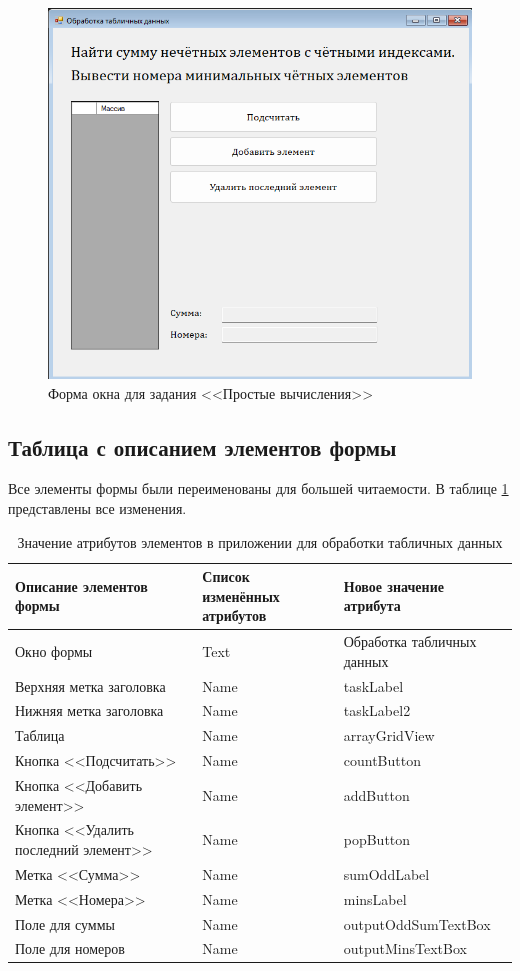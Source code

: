 \begin{figure}
\centering
\includegraphics[width=0.5\linewidth]{images/handling-data-easy/form.png}
\caption{Форма окна для задания <<Простые вычисления>>}
\label{handling-data-easy-form}
\end{figure}

\subsection{Таблица с описанием элементов формы}
Все элементы формы были переименованы для большей читаемости. В таблице \ref{tab:handling-data-easy-form} представлены все изменения.

\begin{table}
\centering
\begin{tabular}{|m{}|m{}|m{}|}
\hline
\textbf{Описание элементов формы} & \textbf{Список изменённых атрибутов} & \textbf{Новое значение атрибута} \\
\hline
\hline
Окно формы & Text & Обработка табличных данных \\
Верхняя метка заголовка & Name & taskLabel \\
Нижняя метка заголовка & Name & taskLabel2 \\
Таблица & Name & arrayGridView \\
Кнопка <<Подсчитать>> & Name & countButton \\
Кнопка <<Добавить элемент>> & Name & addButton \\
Кнопка <<Удалить последний элемент>> & Name & popButton \\
Метка <<Сумма>> & Name & sumOddLabel \\
Метка <<Номера>> & Name & minsLabel \\
Поле для суммы & Name & outputOddSumTextBox \\
Поле для номеров & Name & outputMinsTextBox \\

\hline
\end{tabular}
\caption{Значение атрибутов элементов в приложении для обработки табличных данных}
\label{tab:handling-data-easy-form}
\end{table}

